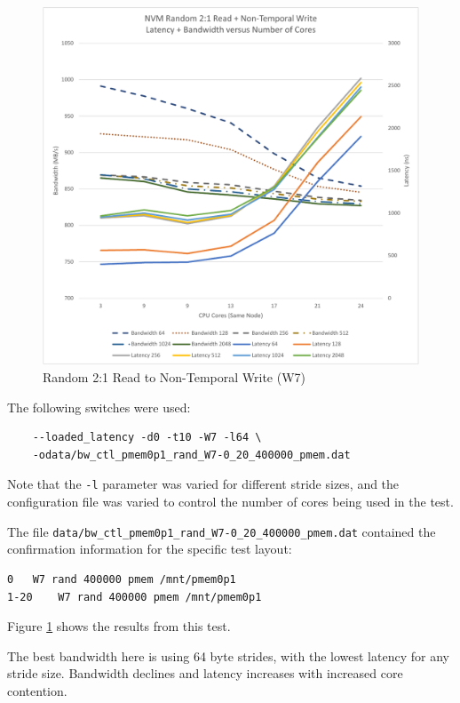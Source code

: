 \begin{figure}
    \centering
    \caption{Random 2:1 Read to Non-Temporal Write (W7)}\label{chart:random:W7}
    \includegraphics[scale=0.5]{charts/random-w7-crop.pdf}
\end{figure}

The following switches were used:

\begin{verbatim}
    --loaded_latency -d0 -t10 -W7 -l64 \
    -odata/bw_ctl_pmem0p1_rand_W7-0_20_400000_pmem.dat
\end{verbatim}

Note that the \verb+-l+ parameter was varied for different
stride sizes, and the configuration file was varied to control
the number of cores being used in the test.

The file \verb+data/bw_ctl_pmem0p1_rand_W7-0_20_400000_pmem.dat+ contained the confirmation information
for the specific test layout:

\begin{verbatim}
0	W7 rand 400000 pmem /mnt/pmem0p1
1-20	W7 rand 400000 pmem /mnt/pmem0p1
\end{verbatim}

Figure \ref{chart:random:W7} shows the results from this test.

The best bandwidth here is using 64 byte strides, with the
lowest latency for any stride size.  Bandwidth declines
and latency increases with increased core contention.

